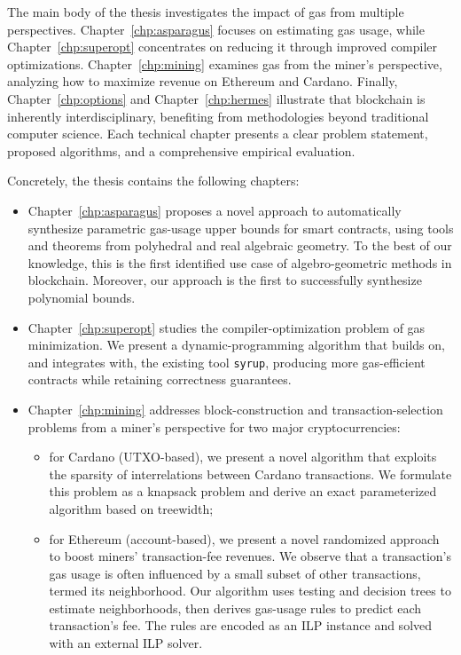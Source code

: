 The main body of the thesis investigates the impact of gas from multiple perspectives. Chapter~\ref{chp:asparagus} focuses on estimating gas usage, while Chapter~\ref{chp:superopt} concentrates on reducing it through improved compiler optimizations. Chapter~\ref{chp:mining} examines gas from the miner's perspective, analyzing how to maximize revenue on Ethereum and Cardano. Finally, Chapter~\ref{chp:options} and Chapter~\ref{chp:hermes} illustrate that blockchain is inherently interdisciplinary, benefiting from methodologies beyond traditional computer science. Each technical chapter presents a clear problem statement, proposed algorithms, and a comprehensive empirical evaluation.


Concretely, the thesis contains the following chapters:

\begin{itemize}
    \item Chapter~\ref{chp:asparagus} proposes a novel approach to automatically synthesize parametric gas-usage upper bounds for smart contracts, using tools and theorems from polyhedral and real algebraic geometry. To the best of our knowledge, this is the first identified use case of algebro-geometric methods in blockchain. Moreover, our approach is the first to successfully synthesize polynomial bounds.

    \item Chapter~\ref{chp:superopt} studies the compiler-optimization problem of gas minimization. We present a dynamic-programming algorithm that builds on, and integrates with, the existing tool \texttt{syrup}, producing more gas-efficient contracts while retaining correctness guarantees.

    \item Chapter~\ref{chp:mining} addresses block-construction and transaction-selection problems from a miner's perspective for two major cryptocurrencies:
    
    \begin{itemize}
        \item for Cardano (UTXO-based), we present a novel algorithm that exploits the sparsity of interrelations between Cardano transactions. We formulate this problem as a knapsack problem and derive an exact parameterized algorithm based on treewidth;
        
        \item for Ethereum (account-based), we present a novel randomized approach to boost miners' transaction-fee revenues. We observe that a transaction's gas usage is often influenced by a small subset of other transactions, termed its neighborhood.
        Our algorithm uses testing and decision trees to estimate neighborhoods, then derives gas-usage rules to predict each transaction’s fee. The rules are encoded as an ILP instance and solved with an external ILP solver.
    \end{itemize}


\end{itemize}
